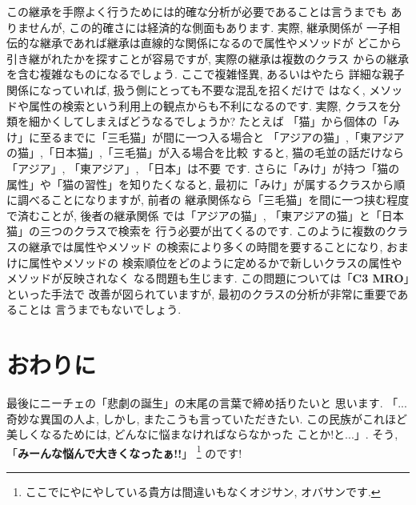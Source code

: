 \documentclass[b5j,8pt,twocolumn]{ltjsarticle}
\begin{document}
この継承を手際よく行うためには的確な分析が必要であることは言うまでも
ありませんが, この的確さには経済的な側面もあります. 実際, 継承関係が
一子相伝的な継承であれば継承は直線的な関係になるので属性やメソッドが
どこから引き継がれたかを探すことが容易ですが, 実際の継承は複数のクラス
からの継承を含む複雑なものになるでしょう. ここで複雑怪異, あるいはやたら
詳細な親子関係になっていれば, 扱う側にとっても不要な混乱を招くだけで
はなく, メソッドや属性の検索という利用上の観点からも不利になるのです.
 実際, クラスを分類を細かくしてしまえばどうなるでしょうか?  たとえば
「猫」から個体の「みけ」に至るまでに「三毛猫」が間に一つ入る場合と
「アジアの猫」,「東アジアの猫」,「日本猫」,「三毛猫」が入る場合を比較
すると, 猫の毛並の話だけなら「アジア」, 「東アジア」, 「日本」は不要
です. さらに「みけ」が持つ「猫の属性」や「猫の習性」を知りたくなると,
 最初に「みけ」が属するクラスから順に調べることになりますが, 前者の
継承関係なら「三毛猫」を間に一つ挟む程度で済むことが, 後者の継承関係
では「アジアの猫」, 「東アジアの猫」と「日本猫」の三つのクラスで検索を
行う必要が出てくるのです. このように複数のクラスの継承では属性やメソッド
の検索により多くの時間を要することになり, おまけに属性やメソッドの
検索順位をどのように定めるかで新しいクラスの属性やメソッドが反映されなく
なる問題も生じます. この問題については「\textbf{C3 MRO}」といった手法で
改善が図られていますが, 最初のクラスの分析が非常に重要であることは
言うまでもないでしょう.

\section{おわりに}

最後にニーチェの「悲劇の誕生」\cite{悲劇の誕生}の末尾の言葉で締め括りたいと
思います. 「...奇妙な異国の人よ, しかし, またこうも言っていただきたい.
 この民族がこれほど美しくなるためには, どんなに悩まなければならなかった
ことか!と...」. そう, 「\textbf{みーんな悩んで大きくなったぁ!!}」\cite{野坂}
\footnote{ここでにやにやしている貴方は間違いもなくオジサン, オバサンです.}
のです!
\end{document}
